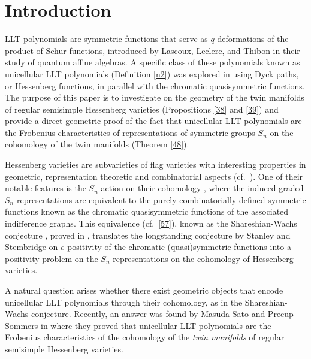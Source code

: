 \section{Introduction}
LLT polynomials are symmetric functions that serve as $q$-deformations of the product of Schur functions, introduced by Lascoux, Leclerc, and Thibon \cite{LLT} in their study of quantum affine algebras.
A specific class of these polynomials known as unicellular LLT polynomials (Definition \ref{n2}) was explored in \cite{CM} using Dyck paths, or Hessenberg functions, in parallel with the chromatic quasisymmetric functions. 
The purpose of this paper is to investigate on the geometry of the twin manifolds of regular semisimple Hessenberg varieties (Propositions \ref{38} and \ref{39}) and provide a direct geometric proof of the fact that  
unicellular LLT polynomials are the Frobenius characteristics of representations of symmetric groups $S_n$ on the cohomology of the twin manifolds (Theorem \ref{48}). 

Hessenberg varieties are subvarieties of flag varieties with interesting properties in geometric, representation theoretic and combinatorial aspects (cf.~\cite{DMPS, AH}). 
One of their notable features is the $S_n$-action on their cohomology \cite{Tym}, where the induced graded $S_n$-representations are equivalent to the purely combinatorially defined symmetric functions known as the chromatic quasisymmetric functions \cite{Sta, SW} of the associated indifference graphs. 
This equivalence (cf.~\eqref{57}), known as the Shareshian-Wachs conjecture \cite{SW}, proved in \cite{BC, GP2}, translates the longstanding conjecture by Stanley and Stembridge \cite{SS} on $e$-positivity of the chromatic (quasi)symmetric functions into a positivity problem on the $S_n$-representations on the cohomology of Hessenberg varieties.


A natural question arises whether there exist geometric objects that encode unicellular LLT polynomials through their cohomology, as in the Shareshian-Wachs conjecture. 
Recently, an answer was found by Masuda-Sato and Precup-Sommers in \cite{MS,PS} 
where they proved
that unicellular LLT polynomials are the Frobenius characteristics of the cohomology of the \emph{twin manifolds} of regular semisimple Hessenberg varieties. 

